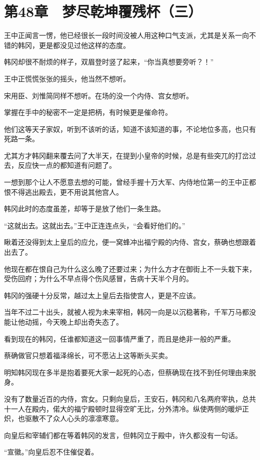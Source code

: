\section{第48章　梦尽乾坤覆残杯（三）}

王中正闻言一愣，他已经很长一段时间没被人用这种口气支派，尤其是关系一向不错的韩冈，更是都没见过他这样的态度。

韩冈却很不耐烦的样子，双眉登时竖了起来，“你当真想要旁听？！”

王中正慌慌张张的摇头，他当然不想听。

宋用臣、刘惟简同样不想听。在场的没一个内侍、宫女想听。

掌握在手中的秘密不一定是把柄，有时候更是催命符。

他们这等天子家奴，听到不该听的话，知道不该知道的事，不论地位多高，也只有死路一条。

尤其方才韩冈翻来覆去问了大半天，在提到小皇帝的时候，总是有些突兀的打岔过去，反应快一点的都知道有问题了。

一想到那个让人不愿意去想的可能，曾经手握十万大军、内侍地位第一的王中正都恨不得逃出殿去，更不用说其他宫人。

韩冈此时的态度虽差，却等于是放了他们一条生路。

“这就出去。这就出去。”王中正连连点头，“会看好他们的。”

瞅着还没得到太上皇后的应允，便一窝蜂冲出福宁殿的内侍、宫女，蔡确也想跟着出去了。

他现在都在恨自己为什么这么晚了还要过来；为什么方才在御街上不一头栽下来，受伤回府；为什么不早点得个伤风感冒，告病十天半个月的。

韩冈的强硬十分反常，越过太上皇后去指使宫人，更是不应该。

当年不过二十出头，就被人视为未来宰相，韩冈一向是以沉稳著称，千军万马都没能让他动摇，今天晚上却出奇失态了。

看到现在的韩冈，任谁都知道这一回事情严重了，而且是绝非一般的严重。

蔡确做官只想着福泽绵长，可不愿沾上这等断头买卖。

明知韩冈现在多半是抱着要死大家一起死的心态，但蔡确现在找不到任何理由来脱身。

没有了数量近百的内侍，宫女。只剩向皇后，王安石，韩冈和八名两府宰执，总共十一人在殿内，偌大的福宁殿顿时显得空旷无比，分外清冷。纵使两侧的暖炉正炽，也驱散不了众人心头的凛凛寒意。

向皇后和宰辅们都在等着韩冈的发言，但韩冈立于殿中，许久都没有一句话。

“宣徽。”向皇后忍不住催促着。

